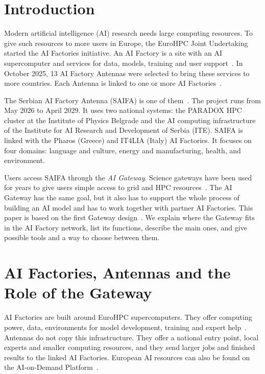 \documentclass[conference,a4paper]{IEEEtran}
\begin{document}
\section{Introduction}

Modern artificial intelligence (AI) research needs large computing resources. To give such resources to more users in Europe, the EuroHPC Joint Undertaking started the AI Factories initiative. An AI Factory is a site with an AI supercomputer and services for data, models, training and user support~\cite{eurohpc_aif}. In October 2025, 13 AI Factory Antennas were selected to bring these services to more countries. Each Antenna is linked to one or more AI Factories~\cite{eurohpc_antennas}.

The Serbian AI Factory Antenna (SAIFA) is one of them~\cite{cordis_saifa}. The project runs from May 2026 to April 2029. It uses two national systems: the PARADOX HPC cluster at the Institute of Physics Belgrade and the AI computing infrastructure of the Institute for AI Research and Development of Serbia (ITE). SAIFA is linked with the Pharos (Greece) and IT4LIA (Italy) AI Factories. It focuses on four domains: language and culture, energy and manufacturing, health, and environment.

Users access SAIFA through the \emph{AI Gateway}. Science gateways have been used for years to give users simple access to grid and HPC resources~\cite{wilkinsdiehr2007}. The AI Gateway has the same goal, but it also has to support the whole process of building an AI model and has to work together with partner AI Factories. This paper is based on the first Gateway design~\cite{saifa_d31}. We explain where the Gateway fits in the AI Factory network, list its functions, describe the main ones, and give possible tools and a way to choose between them.

\section{AI Factories, Antennas and the Role of the Gateway}

AI Factories are built around EuroHPC supercomputers. They offer computing power, data, environments for model development, training and expert help~\cite{eurohpc_aif}. Antennas do not copy this infrastructure. They offer a national entry point, local experts and smaller computing resources, and they send larger jobs and finished results to the linked AI Factories. European AI resources can also be found on the AI-on-Demand Platform~\cite{aiod}.
\end{document}
